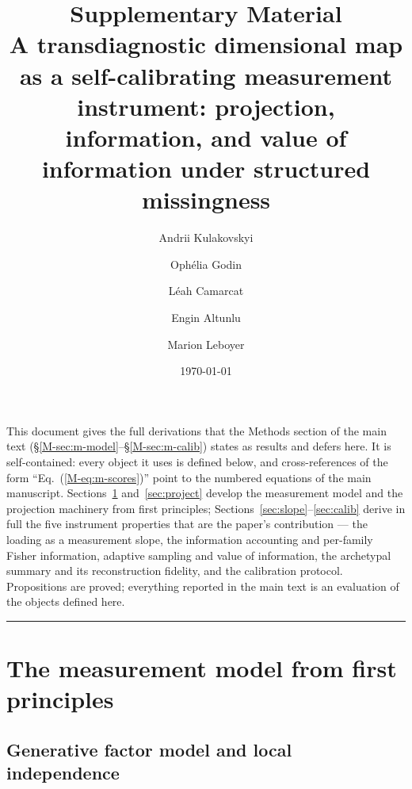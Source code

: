 \documentclass[11pt]{article}
\title{\bfseries Supplementary Material\\[4pt]
\large A transdiagnostic dimensional map as a self-calibrating measurement
instrument: projection, information, and value of information under structured
missingness}
\author{Andrii Kulakovskyi \and Ophélia Godin \and Léah Camarcat \and
Engin Altunlu \and Marion Leboyer}
\date{\today}
\theoremstyle{plain}
\theoremstyle{definition}
\newcommand{\MEq}[1]{Eq.~(\ref{M-#1})}
\newcommand{\MSec}[1]{\S\ref{M-#1}}
\begin{document}
\maketitle

\noindent
This document gives the full derivations that the Methods section of the main text
(\MSec{sec:m-model}--\MSec{sec:m-calib}) states as results and defers here. It is
self-contained: every object it uses is defined below, and cross-references of the
form ``\MEq{eq:m-scores}'' point to the numbered equations of the main manuscript.
Sections~\ref{sec:model} and~\ref{sec:project} develop the measurement model and the
projection machinery from first principles; Sections~\ref{sec:slope}--\ref{sec:calib}
derive in full the five instrument properties that are the paper's contribution --- the
loading as a measurement slope, the information accounting and per-family Fisher
information, adaptive sampling and value of information, the archetypal summary and its
reconstruction fidelity, and the calibration protocol. Propositions are proved;
everything reported in the main text is an evaluation of the objects defined here.

\tableofcontents
\bigskip
\hrule
\bigskip

\section{The measurement model from first principles}
\label{sec:model}

\subsection{Generative factor model and local independence}
\label{sub:gen}
\end{document}
